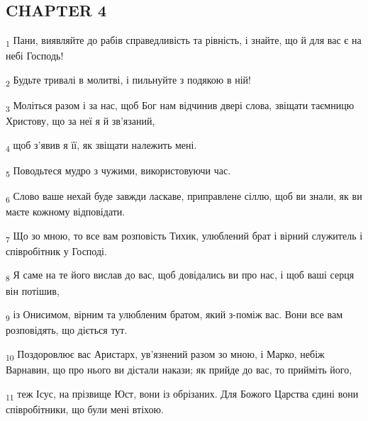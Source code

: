 \subsection{CHAPTER 4}
\begin{tcolorbox}
\textsubscript{1} Пани, виявляйте до рабів справедливість та рівність, і знайте, що й для вас є на небі Господь!
\end{tcolorbox}
\begin{tcolorbox}
\textsubscript{2} Будьте тривалі в молитві, і пильнуйте з подякою в ній!
\end{tcolorbox}
\begin{tcolorbox}
\textsubscript{3} Моліться разом і за нас, щоб Бог нам відчинив двері слова, звіщати таємницю Христову, що за неї я й зв'язаний,
\end{tcolorbox}
\begin{tcolorbox}
\textsubscript{4} щоб з'явив я її, як звіщати належить мені.
\end{tcolorbox}
\begin{tcolorbox}
\textsubscript{5} Поводьтеся мудро з чужими, використовуючи час.
\end{tcolorbox}
\begin{tcolorbox}
\textsubscript{6} Слово ваше нехай буде завжди ласкаве, приправлене сіллю, щоб ви знали, як ви маєте кожному відповідати.
\end{tcolorbox}
\begin{tcolorbox}
\textsubscript{7} Що зо мною, то все вам розповість Тихик, улюблений брат і вірний служитель і співробітник у Господі.
\end{tcolorbox}
\begin{tcolorbox}
\textsubscript{8} Я саме на те його вислав до вас, щоб довідались ви про нас, і щоб ваші серця він потішив,
\end{tcolorbox}
\begin{tcolorbox}
\textsubscript{9} із Онисимом, вірним та улюбленим братом, який з-поміж вас. Вони все вам розповідять, що діється тут.
\end{tcolorbox}
\begin{tcolorbox}
\textsubscript{10} Поздоровлює вас Аристарх, ув'язнений разом зо мною, і Марко, небіж Варнавин, що про нього ви дістали накази; як прийде до вас, то прийміть його,
\end{tcolorbox}
\begin{tcolorbox}
\textsubscript{11} теж Ісус, на прізвище Юст, вони із обрізаних. Для Божого Царства єдині вони співробітники, що були мені втіхою.
\end{tcolorbox}
